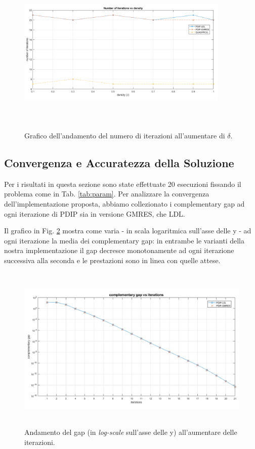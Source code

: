 \begin{figure}[!h]
    \centering
    \includegraphics[width=0.9\textwidth, height = 8cm]{img/MU9.png}
    \caption{Grafico dell'andamento del numero di iterazioni all'aumentare di $\delta$. \label{fig:exp3.2}}
\end{figure}

\subsection{Convergenza e Accuratezza della Soluzione}

Per i risultati in questa sezione sono state effettuate 20 esecuzioni fissando il problema come in Tab. \ref{tab:param}.
Per analizzare la convergenza dell'implementazione proposta, abbiamo collezionato i complementary gap ad ogni iterazione di PDIP sia in versione GMRES, che LDL.

Il grafico in Fig. \ref{fig:gap} mostra come varia - in scala logaritmica sull'asse delle y - ad ogni iterazione la media dei complementary gap: in entrambe le varianti della nostra implementazione il gap decresce monotonamente ad ogni iterazione successiva alla seconda e le prestazioni sono in linea con quelle attese.

\begin{figure}[!h]
    \centering
    \includegraphics[width=\textwidth, height = 8cm]{img/MU6.png}
    \caption{Andamento del gap (in \textit{log-scale} sull'asse delle y) all'aumentare delle iterazioni. \label{fig:gap}}
\end{figure}

